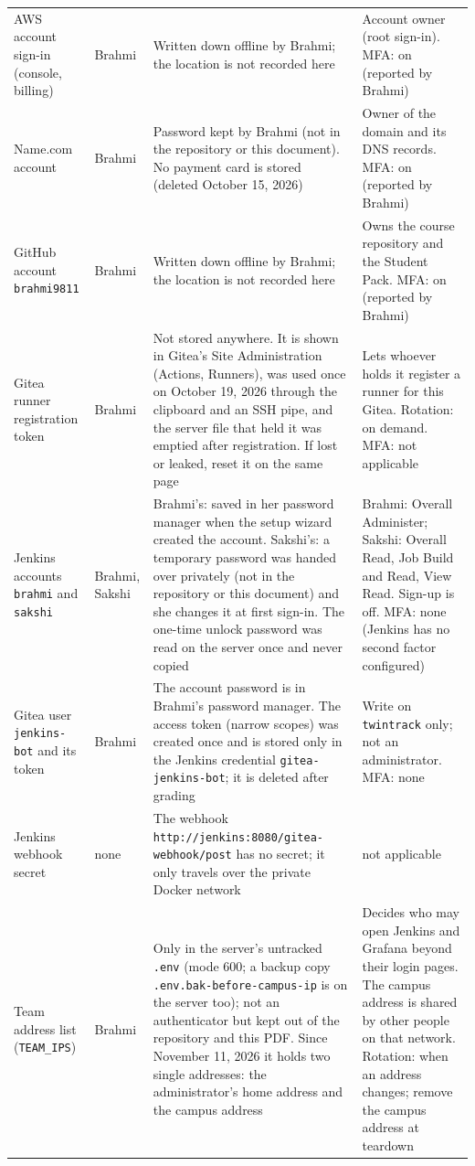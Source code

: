 \begin{tabularx}{\linewidth}{L{3.0cm}L{1.8cm}YL{3.2cm}}
AWS account sign-in (console, billing) & Brahmi & Written down offline by Brahmi; the location is not recorded here & Account owner (root sign-in). MFA: on (reported by Brahmi)\\
Name.com account & Brahmi & Password kept by Brahmi (not in the repository or this document). No payment card is stored (deleted October 15, 2026) & Owner of the domain and its DNS records. MFA: on (reported by Brahmi)\\
GitHub account \texttt{brahmi9811} & Brahmi & Written down offline by Brahmi; the location is not recorded here & Owns the course repository and the Student Pack. MFA: on (reported by Brahmi)\\
Gitea runner registration token & Brahmi & Not stored anywhere. It is shown in Gitea's Site Administration (Actions, Runners), was used once on October 19, 2026 through the clipboard and an SSH pipe, and the server file that held it was emptied after registration. If lost or leaked, reset it on the same page & Lets whoever holds it register a runner for this Gitea. Rotation: on demand. MFA: not applicable\\
Jenkins accounts \texttt{brahmi} and \texttt{sakshi} & Brahmi, Sakshi & Brahmi's: saved in her password manager when the setup wizard created the account. Sakshi's: a temporary password was handed over privately (not in the repository or this document) and she changes it at first sign-in. The one-time unlock password was read on the server once and never copied & Brahmi: Overall Administer; Sakshi: Overall Read, Job Build and Read, View Read. Sign-up is off. MFA: none (Jenkins has no second factor configured)\\
Gitea user \texttt{jenkins-bot} and its token & Brahmi & The account password is in Brahmi's password manager. The access token (narrow scopes) was created once and is stored only in the Jenkins credential \texttt{gitea-jenkins-bot}; it is deleted after grading & Write on \texttt{twintrack} only; not an administrator. MFA: none\\
Jenkins webhook secret & none & The webhook \texttt{http://jenkins:8080/gitea-webhook/post} has no secret; it only travels over the private Docker network & not applicable\\
Team address list (\texttt{TEAM\_IPS}) & Brahmi & Only in the server's untracked \texttt{.env} (mode 600; a backup copy \texttt{.env.bak-before-campus-ip} is on the server too); not an authenticator but kept out of the repository and this PDF. Since November 11, 2026 it holds two single addresses: the administrator's home address and the campus address & Decides who may open Jenkins and Grafana beyond their login pages. The campus address is shared by other people on that network. Rotation: when an address changes; remove the campus address at teardown\\

\end{tabularx}
